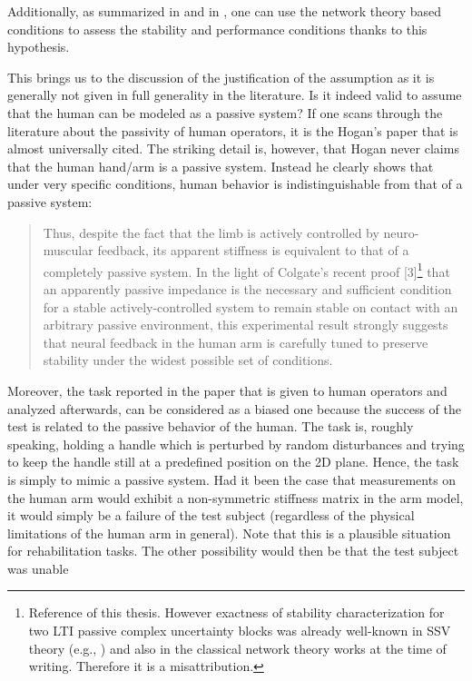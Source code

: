 Additionally, as summarized in  and in , one can use the 
network theory based conditions to assess the stability and performance conditions thanks to this hypothesis.

This brings us to the discussion of the justification of the assumption as it is generally not given in full generality in the
literature. Is it indeed valid to assume that the human can be modeled as a passive system? If one scans through the literature 
about the passivity of human operators, it is the Hogan's paper \cite{hogan89}
that is almost universally cited. The striking detail is, however, that Hogan never claims that the human hand/arm is a passive
system. Instead he clearly shows that under very specific conditions, human behavior is indistinguishable from that of a 
passive system: 
\begin{quote}
Thus, despite the fact that the
limb is actively controlled by neuro-muscular feedback, its apparent stiffness is equivalent to that of a completely passive
system. In the light of Colgate's recent proof [3]\footnote{Reference \cite{colgatehogan88} of this thesis. However exactness 
of stability characterization for two LTI passive complex uncertainty blocks was already well-known in SSV theory (e.g., \cite{packdoyle}) 
and also in the classical network theory works at the time of writing. Therefore it is a misattribution.} that an apparently 
passive impedance is the necessary and sufficient condition for a stable actively-controlled system to remain stable on contact 
with an arbitrary passive environment, this experimental result strongly suggests that neural feedback in the human arm is carefully 
tuned to preserve stability under the widest possible set of conditions.
\end{quote}
Moreover, the task reported in the paper that is given to human operators and analyzed afterwards, can be considered as a biased one because the success 
of the test is related to the passive behavior of the human. The task is, roughly speaking, holding a handle which is perturbed by 
random disturbances and trying to keep the handle still at a predefined position on the 2D plane. Hence, the task is simply to mimic 
a passive system. Had it been the case that measurements on the human arm would exhibit a non-symmetric stiffness matrix in the arm 
model, it would simply be a failure of the test subject (regardless of the physical limitations of the human arm in general). Note 
that this is a plausible situation for rehabilitation tasks. The other possibility would then be that the test subject was unable 
